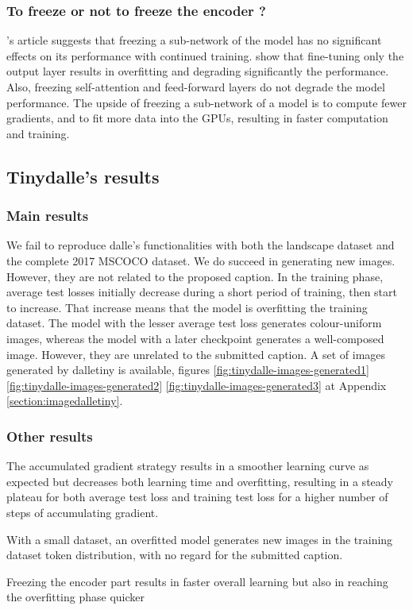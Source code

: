 \documentclass{article}
\begin{document}
\begin{multicols}{2}
\subsubsection{To freeze or not to freeze the encoder ?}

\citeauthor{thompson-etal-2018-freezing}'s article suggests that freezing a sub-network of the model has no significant effects on its performance with continued training. \cite{thompson-etal-2018-freezing} show that fine-tuning only the output layer results in overfitting and degrading significantly the performance. Also, freezing self-attention and feed-forward layers do not degrade the model performance.
The upside of freezing a sub-network of a model is to compute fewer gradients, and to fit more data into the GPUs, resulting in faster computation and training.

\subsection{Tinydalle's results}\label{subsec:tinydalle_results}

\subsubsection{Main results}

We fail to reproduce \gls{dalle}'s functionalities with both the landscape dataset and the complete 2017 MSCOCO dataset. We do succeed in generating new images. However, they are not related to the proposed caption. In the training phase, average test losses initially decrease during a short period of training, then start to increase. That increase means that the model is overfitting the training dataset. The model with the lesser average test loss generates colour-uniform images, whereas the model with a later checkpoint generates a well-composed image. However, they are unrelated to the submitted caption. A set of images generated by \gls{dalletiny} is available, figures \ref{fig:tinydalle-images-generated1} \ref{fig:tinydalle-images-generated2} \ref{fig:tinydalle-images-generated3} at Appendix \ref{section:imagedalletiny}.

\subsubsection{Other results}

The accumulated gradient strategy results in a smoother learning curve as expected but decreases both learning time and overfitting, resulting in a steady plateau for both average test loss and training test loss for a higher number of steps of accumulating gradient.

With a small dataset, an overfitted model generates new images in the training dataset token distribution, with no regard for the submitted caption.

Freezing the encoder part results in faster overall learning but also in reaching the overfitting phase quicker

\end{multicols}
\end{document}
